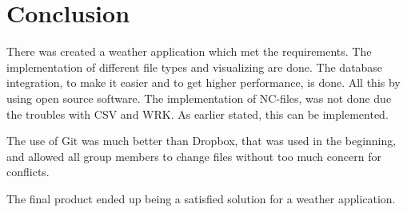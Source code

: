 \chapter{Conclusion}
There was created a weather application which met the requirements.
The implementation of different file types and visualizing are done. The database integration, to make it easier and to get higher performance, is done. All this by using open source software.
The implementation of NC-files, was not done due the troubles with CSV and WRK. As earlier stated, this can be implemented.

The use of Git was much better than Dropbox, that was used in the beginning, and allowed all group members to change files without too much concern for conflicts. 

The final product ended up being a satisfied solution for a weather application.